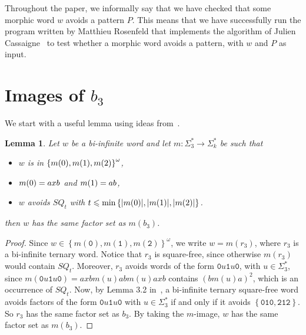 \documentclass{article}
\def\acc#1{\left\{ #1 \right\}}
\renewcommand{\le}{\leqslant}
\theoremstyle{plain}
\newtheorem{lemma}[theorem]{Lemma}
\theoremstyle{definition}
\theoremstyle{remark}
\begin{document}
Throughout the paper, we informally say that we have checked that some morphic word $w$ avoids a pattern $P$.
This means that we have successfully run the program written by Matthieu Rosenfeld that implements the algorithm of
Julien Cassaigne~\cite{cassaignealgo} to test whether a morphic word avoids a pattern, with $w$ and $P$ as input.

\section{Images of $b_3$}\label{sec:b3}
We start with a useful lemma using ideas from~\cite{BO15}.
\begin{lemma}\label{lem:b3}
Let $w$ be a bi-infinite word and let $m:\Sigma^*_3\rightarrow\Sigma^*_k$ be such that 
\begin{itemize}
 \item $w$ is in $\acc{m(\textnormal{\texttt{0}}),m(\textnormal{\texttt{1}}),m(\textnormal{\texttt{2}})}^\omega$,
 \item $m(\textnormal{\texttt{0}})=axb$ and $m(\textnormal{\texttt{1}})=ab$,
 \item $w$ avoids $SQ_t$ with $t\le\min\acc{|m(\textnormal{\texttt{0}})|,|m(\textnormal{\texttt{1}})|,|m(\textnormal{\texttt{2}})|}$.
\end{itemize}
then $w$ has the same factor set as $m(b_3)$.
\end{lemma}

\begin{proof}
Since $w\in\acc{m(\texttt{0}),m(\texttt{1}),m(\texttt{2})}^\omega$, we write $w=m(r_3)$,
where $r_3$ is a bi-infinite ternary word.
Notice that $r_3$ is square-free, since otherwise $m(r_3)$ would contain $SQ_t$.
Moreover, $r_3$ avoids words of the form $\texttt{0}u\texttt{1}u\texttt{0}$, with $u\in\Sigma_3^*$, since
$m(\texttt{0}u\texttt{1}u\texttt{0})=axbm(u)abm(u)axb$ contains $(bm(u)a)^2$, which is an occurrence of $SQ_t$.
Now, by Lemma 3.2 in~\cite{aabbc}, a bi-infinite ternary square-free word avoids factors of the form
$\texttt{0}u\texttt{1}u\texttt{0}$ with $u\in\Sigma_3^*$ if and only if it avoids $\acc{\texttt{010},\texttt{212}}$.
So $r_3$ has the same factor set as $b_3$.
By taking the $m$-image, $w$ has the same factor set as $m(b_3)$.
\end{proof}
\end{document}

